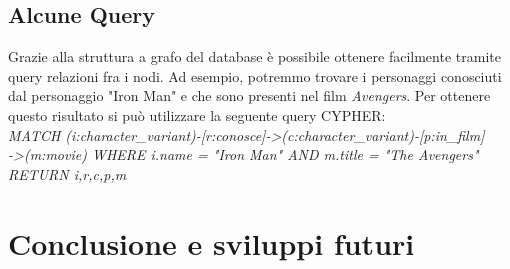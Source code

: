 \documentclass[
12pt, %
a4paper, %
oneside, %
headinclude,footinclude, %
BCOR5mm, %
]{scrartcl}
\begin{document}
\subsection{Alcune Query}
 Grazie alla struttura a grafo del database è possibile ottenere 
 facilmente tramite query relazioni fra i nodi. Ad esempio, potremmo 
 trovare i personaggi conosciuti dal personaggio "Iron Man" e che sono presenti nel film \textit{Avengers}. 
	Per ottenere questo risultato si può utilizzare la seguente query 
	CYPHER: \\\newline \textit{MATCH (i:character\_variant)-[r:conosce]->(c:character\_variant)-[p:in\_film]\\->(m:movie) WHERE i.name = "Iron Man"  AND m.title = "The Avengers" RETURN i,r,c,p,m} 


\section{Conclusione e sviluppi futuri}


\renewcommand{\refname}{\spacedlowsmallcaps{References}} %




\end{document}
